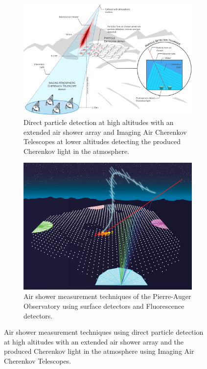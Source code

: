 \begin{figure}
    \centering
    \begin{subfigure}{0.9\textwidth}
        \centering
        \includegraphics[width=\textwidth]{./images/detector_swgo.jpg}
        \caption{Direct particle detection at high altitudes with an extended air shower array and Imaging Air Cherenkov Telescopes at lower altitudes detecting the produced Cherenkov light in the atmosphere. \cite{SWGO19}}
        \label{fig:detect_swgo}
    \end{subfigure}
    \begin{subfigure}{0.7\textwidth}
        \vspace{0.5cm}
        \centering
        \includegraphics[width=\textwidth]{./images/detector_auger.png}
        \caption{Air shower measurement techniques of the Pierre-Auger Observatory using surface detectors and Fluorescence detectors. \cite{Gaisser16Auger}}
        \label{fig:detect_auger}
    \end{subfigure}
    \caption{Air shower measurement techniques using direct particle detection at high altitudes with an extended air shower array and the produced Cherenkov light in the atmosphere using Imaging Air Cherenkov Telescopes.}
    \label{fig:detect_air_shower}
\end{figure}

